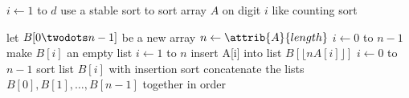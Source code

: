 \documentclass{article}
\begin{document}
\begin{codebox}
\li \For $i \gets 1$ to $d$
\li \Do
        use a stable sort to sort array $A$ on digit $i$ \Comment like counting sort
    \End
\end{codebox}

\begin{codebox}
\li let $B[0 \twodots n-1]$ be a new array
\li $n \gets \attrib{A}{length}$
\li \For $i \gets 0$ to $n-1$
\li     \Do
            make $B[i]$ an empty list
        \End
\li \For $i \gets 1$ to $n$
\li     \Do
            insert A[i] into list $B[\lfloor n A[i] \rfloor]$
        \End 
\li \For $i \gets 0$ to $n-1$
\li     \Do
            sort list $B[i]$ with insertion sort
        \End
\li concatenate the lists $B[0], B[1], \ldots, B[n-1]$ together in order
\end{codebox}
\end{document}
